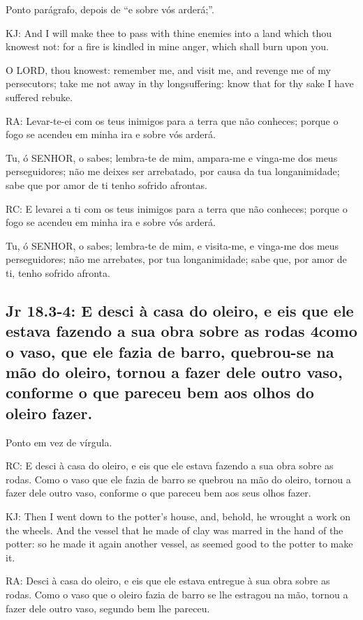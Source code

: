 Ponto parágrafo, depois de ``e sobre vós arderá;''.

KJ: And I will make thee to pass with thine enemies into a land which thou knowest not: for a fire is kindled in mine anger, which shall burn upon you.

O LORD, thou knowest: remember me, and visit me, and revenge me of my persecutors; take me not away in thy longsuffering: know that for thy sake I have suffered rebuke.

RA: Levar-te-ei com os teus inimigos para a terra que não conheces; porque o fogo se acendeu em minha ira e sobre vós arderá.

Tu, ó SENHOR, o sabes; lembra-te de mim, ampara-me e vinga-me dos meus perseguidores; não me deixes ser arrebatado, por causa da tua longanimidade; sabe que por amor de ti tenho sofrido afrontas.

RC: E levarei a ti com os teus inimigos para a terra que não conheces; porque o fogo se acendeu em minha ira e sobre vós arderá.

Tu, ó SENHOR, o sabes; lembra-te de mim, e visita-me, e vinga-me dos meus perseguidores; não me arrebates, por tua longanimidade; sabe que, por amor de ti, tenho sofrido afronta.

\subsection{Jr 18.3-4: E desci à casa do oleiro, e eis que ele estava fazendo a sua obra sobre as rodas\uwave{,} 4como o vaso, que ele fazia de barro, quebrou-se na mão do oleiro, tornou a fazer dele outro vaso, conforme o que pareceu bem aos olhos do oleiro fazer.}

Ponto em vez de vírgula.

RC: E desci à casa do oleiro, e eis que ele estava fazendo a sua obra sobre as rodas. Como o vaso que ele fazia de barro se quebrou na mão do oleiro, tornou a fazer dele outro vaso, conforme o que pareceu bem aos seus olhos fazer.

KJ: Then I went down to the potter's house, and, behold, he wrought a work on the wheels. And the vessel that he made of clay was marred in the hand of the potter: so he made it again another vessel, as seemed good to the potter to make it.

RA: Desci à casa do oleiro, e eis que ele estava entregue à sua obra sobre as rodas. Como o vaso que o oleiro fazia de barro se lhe estragou na mão, tornou a fazer dele outro vaso, segundo bem lhe pareceu.

